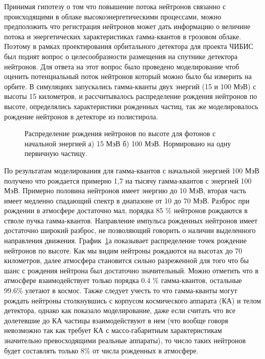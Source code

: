 Принимая гипотезу о том что повышение потока нейтронов связанно с происходящими в облаке высокоэнергетическими процессами, можно предположить что регистрация нейтронов может дать информацию о величине потока и энергетических характеристиках гамма-квантов в грозовом облаке. Поэтому в рамках проектирования орбитального детектора для проекта ЧИБИС был поднят вопрос о целесообразности размещения на спутнике детектора нейтронов. Для ответа на этот вопрос было проведено моделирование чтоб оценить потенциальный поток нейтронов который можно было бы измерить на орбите. В симуляциях запускались гамма-кванты двух энергий  (15 и 100 МэВ) с высоты 15 километров, и рассчитывалось распределение рождения нейтронов по высоте, определялись характеристики рожденных частиц, так же моделировалось рождение нейтронов в детекторе из полистирола. 

\begin{figure}[t]
    \begin{center}
        \begin{minipage}[h]{0.49\linewidth}
        \end{minipage}
        \hfill
        \begin{minipage}[h]{0.49\linewidth}
        \end{minipage}
        \caption{Распределение рождения нейтронов по высоте для фотонов с начальной энергией а) 15 МэВ б) 100 МэВ. Нормировано на одну первичную частицу.}
    \end{center}
    \label{fig:storm:neutron_z}
\end{figure}

По результатам моделирования для гамма-квантов с начальной энергией 100 МэВ получено что рождается примерно 1,7 на тысячу гамма-квантов с энергией 100 МэВ. Примерно половина нейтронов имеет энергию до 10 МэВ, вторая часть имеет медленно спадающий спектр в диапазоне от 10 до 70 МэВ. Разброс при рождении в атмосфере достаточно мал, порядка 85 \% нейтронов рождаются в стволе пучка гамма-квантов. Направление импульса рожденных нейтронов имеет достаточно широкий разброс, не позволяющий говорить о наличии выделенного направления движения. График~\ref{fig:storm:neutron_z}а показывает распределение точек рождение нейтронов по высоте. Как мы видим нейтроны рождаются на высотах до 70 километров, далее атмосфера становится сильно разреженной для того что бы шанс с рождения нейтрона был достаточно значительный. Можно отметить что в атмосфере взаимодействует только порядка 0.4 \% гамма-квантов, остальные 99.6\% улетают в космос. Также следует учесть то что гамма-кванты могут рождать нейтроны столкнувшись с корпусом космического аппарата (КА) и телом детектора, однако как показало моделирование, даже если считать что все долетевшие до КА частицы взаимодействуют в нем (что вообще говоря невозможно так как требует КА с массо-габаритным характеристикам значительно превосходящими реальные аппараты), то число таких нейтронов будет составлять только 8\% от числа рожденных в атмосфере.


